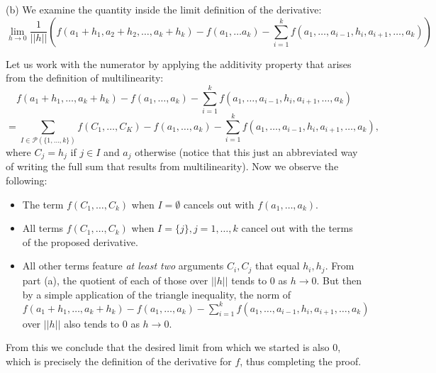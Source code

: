 \begin{solution}
    (b) We examine the quantity inside the limit definition of the derivative:
    $$\lim_{h \rightarrow 0} \frac{1}{\lvert \lvert h \rvert \rvert}(f(a_1 + h_1, a_2 + h_2, \ldots, a_k + h_k) - f(a_1, \ldots a_k) - \sum_{i=1}^{k} f(a_1, \ldots, a_{i-1}, h_i, a_{i+1}, \ldots, a_k))$$
    
    Let us work with the numerator by applying the additivity property that arises from the definition of multilinearity:
    $$f(a_1 + h_1, \ldots, a_k + h_k) - f(a_1, \ldots, a_k) - \sum_{i=1}^{k} f(a_1, \ldots, a_{i-1}, h_i, a_{i+1}, \ldots, a_k) $$
    $$ = \sum_{I \in \mathcal{P}(\{1, \ldots, k\})} f(C_1, \ldots, C_K) - f(a_1, \ldots, a_k) - \sum_{i=1}^{k}f(a_1, \ldots, a_{i-1}, h_i, a_{i+1}, \ldots, a_k),$$
    where $C_j = h_j$ if $j \in I$ and $a_j$ otherwise (notice that this just an abbreviated way of writing the full sum that results from multilinearity).
    Now we observe the following:
    \begin{itemize}
        \item The term $f(C_1, \ldots, C_k)$ when $I = \emptyset$ cancels out with $f(a_1, \ldots, a_k)$.
        \item  All terms $f(C_1, \ldots, C_k)$ when $I = \{j\}, j =1, \ldots, k$ cancel out with the terms of the proposed derivative.
        \item All other terms feature \textit{at least two} arguments $C_i, C_j$ that equal $h_i, h_j$. From part (a), the quotient of each of those over $\lvert \lvert h \rvert \rvert$ tends to 0 as $h \rightarrow 0$. 
        But then by a simple application of the triangle inequality, the norm of $f(a_1 + h_1, \ldots, a_k + h_k) - f(a_1, \ldots, a_k) - \sum_{i=1}^{k} f(a_1, \ldots, a_{i-1}, h_i, a_{i+1}, \ldots, a_k)$ over $\lvert \lvert h \rvert \rvert$ also tends to 0 as $h \rightarrow 0$.
    \end{itemize}
    From this we conclude that the desired limit from which we started is also 0, which is precisely the definition of the derivative for $f$, thus completing the proof.
    
\end{solution} 

\newpage

